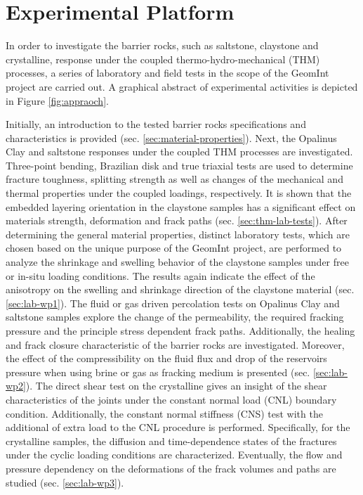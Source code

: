 \chapter{Experimental Platform}
\label{cha:exp}

In order to investigate the barrier rocks, such as saltstone, claystone and crystalline, response under the coupled thermo-hydro-mechanical (THM) processes, a series of laboratory and field tests in the scope of the GeomInt project are carried out. A graphical abstract of experimental activities is depicted in Figure \ref{fig:appraoch}.

Initially, an introduction to the tested barrier rocks specifications and characteristics is provided (sec. \ref{sec:material-properties}). Next, the Opalinus Clay and saltstone responses under the coupled THM processes are investigated. Three-point bending, Brazilian disk and true triaxial tests are used to determine fracture toughness, splitting strength as well as changes of the mechanical and thermal properties under the coupled loadings, respectively. It is shown that the embedded layering orientation in the claystone samples has a significant effect on materials strength, deformation and frack paths (sec. \ref{sec:thm-lab-tests}).
%
After determining the general material properties, distinct laboratory tests, which are chosen based on the unique purpose of the GeomInt project, are performed to analyze the shrinkage and swelling behavior of the claystone samples under free or in-situ loading conditions. The results again indicate the effect of the anisotropy on the swelling and shrinkage direction of the claystone material (sec. \ref{sec:lab-wp1}). 
%
The fluid or gas driven percolation tests on Opalinus Clay and saltstone samples explore the change of the permeability, the required fracking pressure and the principle stress dependent frack paths. Additionally, the healing and frack closure characteristic of the barrier rocks are investigated. Moreover, the effect of the compressibility on the fluid flux and drop of the reservoirs pressure when using brine or gas as fracking medium is presented (sec. \ref{sec:lab-wp2}).
%
The direct shear test on the crystalline gives an insight of the shear characteristics of the joints under the constant normal load (CNL) boundary condition. Additionally, the constant normal stiffness (CNS) test with the additional of extra load to the CNL procedure is performed. Specifically, for the crystalline samples, the diffusion and time-dependence states of the fractures under the cyclic loading conditions are characterized. Eventually, the flow and pressure dependency on the deformations of the frack volumes and paths are studied (sec. \ref{sec:lab-wp3}).


